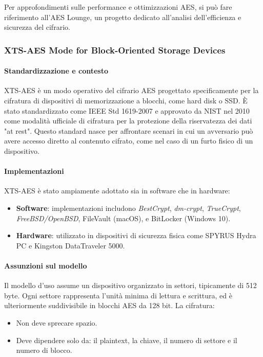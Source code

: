 \documentclass{report}
\begin{document}
Per approfondimenti sulle performance e ottimizzazioni AES, si può fare riferimento all’AES Lounge, un progetto dedicato all’analisi dell’efficienza e sicurezza del cifrario.

\subsubsection{XTS-AES Mode for Block-Oriented Storage Devices}

\paragraph{Standardizzazione e contesto}

XTS-AES è un modo operativo del cifrario AES progettato specificamente per la cifratura di dispositivi di memorizzazione a blocchi, come hard disk o SSD. È stato standardizzato come IEEE Std 1619-2007 e approvato da NIST nel 2010 come modalità ufficiale di cifratura per la protezione della riservatezza dei dati "at rest". Questo standard nasce per affrontare scenari in cui un avversario può avere accesso diretto al contenuto cifrato, come nel caso di un furto fisico di un dispositivo.

\paragraph{Implementazioni}

XTS-AES è stato ampiamente adottato sia in software che in hardware:
\begin{itemize}
    \item \textbf{Software}: implementazioni includono \textit{BestCrypt}, \textit{dm-crypt}, \textit{TrueCrypt}, \textit{FreeBSD/OpenBSD}, FileVault (macOS), e BitLocker (Windows 10).
    \item \textbf{Hardware}: utilizzato in dispositivi di sicurezza fisica come SPYRUS Hydra PC e Kingston DataTraveler 5000.
\end{itemize}

\paragraph{Assunzioni sul modello}

Il modello d’uso assume un dispositivo organizzato in settori, tipicamente di 512 byte. Ogni settore rappresenta l’unità minima di lettura e scrittura, ed è ulteriormente suddivisibile in blocchi AES da 128 bit. La cifratura:
\begin{itemize}
    \item Non deve sprecare spazio.
    \item Deve dipendere solo da: il plaintext, la chiave, il numero di settore e il numero di blocco.
\end{itemize}
\end{document}
